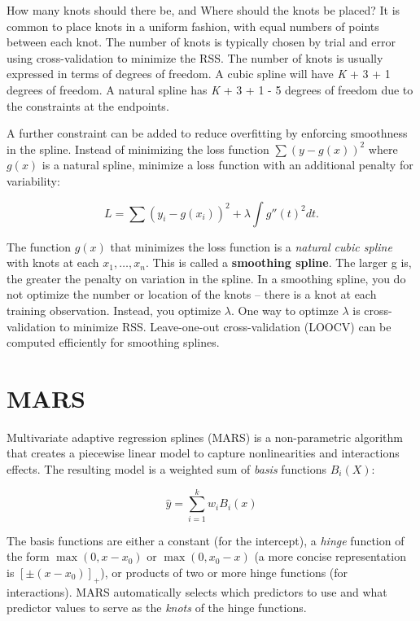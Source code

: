 \documentclass[
]{book}
\begin{document}
How many knots should there be, and Where should the knots be placed? It is common to place knots in a uniform fashion, with equal numbers of points between each knot. The number of knots is typically chosen by trial and error using cross-validation to minimize the RSS. The number of knots is usually expressed in terms of degrees of freedom. A cubic spline will have \emph{K} + 3 + 1 degrees of freedom. A natural spline has \emph{K} + 3 + 1 - 5 degrees of freedom due to the constraints at the endpoints.

A further constraint can be added to reduce overfitting by enforcing smoothness in the spline. Instead of minimizing the loss function \(\sum{(y - g(x))^2}\) where \(g(x)\) is a natural spline, minimize a loss function with an additional penalty for variability:

\[L = \sum{(y_i - g(x_i))^2 + \lambda \int g''(t)^2dt}.\]

The function \(g(x)\) that minimizes the loss function is a \emph{natural cubic spline} with knots at each \(x_1, \dots, x_n\). This is called a \textbf{smoothing spline}. The larger g is, the greater the penalty on variation in the spline. In a smoothing spline, you do not optimize the number or location of the knots -- there is a knot at each training observation. Instead, you optimize \(\lambda\). One way to optimze \(\lambda\) is cross-validation to minimize RSS. Leave-one-out cross-validation (LOOCV) can be computed efficiently for smoothing splines.

\hypertarget{mars}{%
\section{MARS}\label{mars}}

Multivariate adaptive regression splines (MARS) is a non-parametric algorithm that creates a piecewise linear model to capture nonlinearities and interactions effects. The resulting model is a weighted sum of \emph{basis} functions \(B_i(X)\):

\[\hat{y} = \sum_{i=1}^{k}{w_iB_i(x)}\]

The basis functions are either a constant (for the intercept), a \emph{hinge} function of the form \(\max(0, x - x_0)\) or \(\max(0, x_0 - x)\) (a more concise representation is \([\pm(x - x_0)]_+\)), or products of two or more hinge functions (for interactions). MARS automatically selects which predictors to use and what predictor values to serve as the \emph{knots} of the hinge functions.
\end{document}
